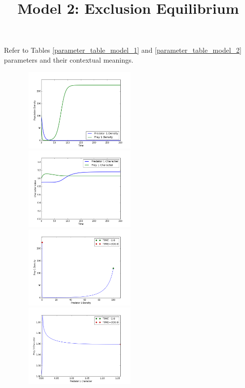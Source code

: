 \documentclass{amsart}
\theoremstyle{definition}
\theoremstyle{remark}
\numberwithin{equation}{section}
\begin{document}
Refer to Tables \ref{parameter_table_model_1} and \ref{parameter_table_model_2} parameters and their contextual meanings.
\begin{centering}
	\begin{figure}
		\title{\bf Model 2: Exclusion Equilibrium\\}
		\includegraphics[width=6cm,height=4.1cm]{figures/1x1/variable_growth/stable_exclusion/densities.png}
		\includegraphics[width=6cm,height=4.1cm]{figures/1x1/variable_growth/stable_exclusion/traits.png}
		\includegraphics[width=6cm,height=4.1cm]{figures/1x1/variable_growth/stable_exclusion/density_phase_plane.png}
		\includegraphics[width=6cm,height=4.1cm]{figures/1x1/variable_growth/stable_exclusion/trait_phase_plane.png}

\end{figure}
\end{centering}
\end{document}
